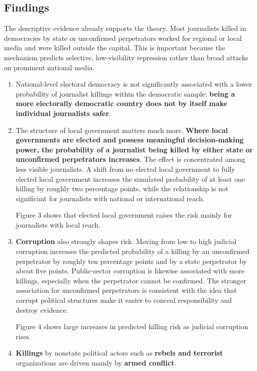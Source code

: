 \subsection{Findings}

The descriptive evidence already supports the theory. Most journalists killed in democracies by state or unconfirmed perpetrators worked for regional or local media and were killed outside the capital. This is important because the mechanism predicts selective, low-visibility repression rather than broad attacks on prominent national media.

\begin{enumerate}
    \item National-level electoral democracy is not significantly associated with a lower probability of journalist killings within the democratic sample: \textbf{being a more electorally democratic country does not by itself make individual journalists safer}.

    \item The structure of local government matters much more. \textbf{Where local governments are elected and possess meaningful decision-making power, the probability of a journalist being killed by either state or unconfirmed perpetrators increases}. The effect is concentrated among less visible journalists. A shift from no elected local government to fully elected local government increases the simulated probability of at least one killing by roughly two percentage points, while the relationship is not significant for journalists with national or international reach.

    Figure 3 shows that elected local government raises the risk mainly for journalists with local reach.

    \item \textbf{Corruption} also strongly shapes risk. Moving from low to high judicial corruption increases the predicted probability of a killing by an unconfirmed perpetrator by roughly ten percentage points and by a state perpetrator by about five points. Public-sector corruption is likewise associated with more killings, especially when the perpetrator cannot be confirmed. The stronger association for unconfirmed perpetrators is consistent with the idea that corrupt political structures make it easier to conceal responsibility and destroy evidence.

    Figure 4 shows large increases in predicted killing risk as judicial corruption rises.

    \item \textbf{Killings} by nonstate political actors such as \textbf{rebels and terrorist} organizations are driven mainly by \textbf{armed conflict}.


\end{enumerate}
